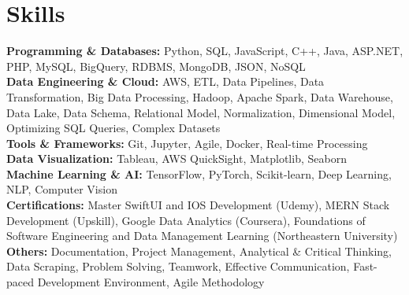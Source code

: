 \documentclass[a4paper,10pt]{article}
\begin{document}
\section*{Skills}
\textbf{Programming & Databases:} Python, SQL, JavaScript, C++, Java, ASP.NET, PHP, MySQL, BigQuery, RDBMS, MongoDB, JSON, NoSQL \\
\textbf{Data Engineering \& Cloud:} AWS, ETL, Data Pipelines, Data Transformation, Big Data Processing, Hadoop, Apache Spark, Data Warehouse, Data Lake, Data Schema, Relational Model, Normalization, Dimensional Model, Optimizing SQL Queries, Complex Datasets \\
\textbf{Tools & Frameworks:} Git, Jupyter, Agile, Docker, Real-time Processing \\
\textbf{Data Visualization:} Tableau, AWS QuickSight, Matplotlib, Seaborn \\
\textbf{Machine Learning \& AI:} TensorFlow, PyTorch, Scikit-learn, Deep Learning, NLP, Computer Vision \\
\textbf{Certifications:} Master SwiftUI and IOS Development (Udemy), MERN Stack Development (Upskill), Google Data Analytics (Coursera), Foundations of Software Engineering and Data Management Learning (Northeastern University) \\
\textbf{Others:} Documentation, Project Management, Analytical \& Critical Thinking, Data Scraping, Problem Solving, Teamwork, Effective Communication, Fast-paced Development Environment, Agile Methodology \\

\vspace{-4mm}
\end{document}
